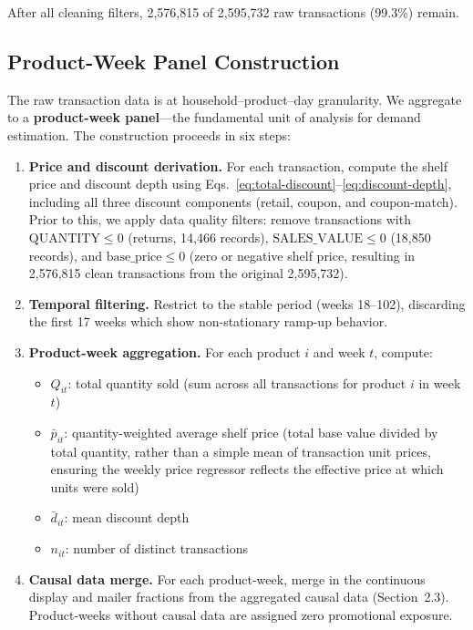 \documentclass[12pt,a4paper]{article}
\begin{document}
After all cleaning filters, 2,576,815 of 2,595,732 raw transactions
(99.3\%) remain.

\subsection{Product-Week Panel Construction}
\label{sec:panel-construction}

The raw transaction data is at household--product--day granularity.
We aggregate to a \textbf{product-week panel}---the fundamental unit
of analysis for demand estimation. The construction proceeds in six
steps:

\begin{enumerate}
\item \textbf{Price and discount derivation.} For each transaction,
compute the shelf price and discount depth using
Eqs.~\eqref{eq:total-discount}--\eqref{eq:discount-depth},
including all three discount components (retail, coupon, and
coupon-match).
Prior to this, we apply data quality filters: remove transactions
with $\text{QUANTITY} \leq 0$ (returns, 14,466 records),
$\text{SALES\_VALUE} \leq 0$ (18,850 records), and
$\text{base\_price} \leq 0$ (zero or negative shelf price,
resulting in 2,576,815 clean transactions from the original
2,595,732).

\item \textbf{Temporal filtering.} Restrict to the stable period
(weeks 18--102), discarding the first 17 weeks which show non-stationary
ramp-up behavior.

\item \textbf{Product-week aggregation.} For each product $i$ and
week $t$, compute:
\begin{itemize}[nosep]
\item $Q_{it}$: total quantity sold (sum across all transactions for
product $i$ in week $t$)
\item $\bar{p}_{it}$: quantity-weighted average shelf price
(total base value divided by total quantity, rather than a simple
mean of transaction unit prices, ensuring the weekly price regressor
reflects the effective price at which units were sold)
\item $\bar{d}_{it}$: mean discount depth
\item $n_{it}$: number of distinct transactions
\end{itemize}

\item \textbf{Causal data merge.} For each product-week, merge in
the continuous display and mailer fractions from the aggregated causal
data (Section~2.3). Product-weeks without causal data are assigned
zero promotional exposure.


\end{enumerate}
\end{document}
